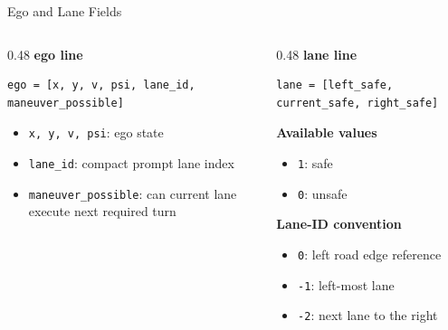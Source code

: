 \documentclass[aspectratio=169]{beamer}
\begin{document}
\begin{frame}[fragile]{Ego and Lane Fields}
\begin{columns}[T]
    \begin{column}{0.48\textwidth}
        \textbf{ego line}
        \begin{lstlisting}[style=codestyle]
ego = [x, y, v, psi, lane_id, maneuver_possible]
        \end{lstlisting}

        \begin{itemize}
            \item \texttt{x, y, v, psi}: ego state
            \item \texttt{lane\_id}: compact prompt lane index
            \item \texttt{maneuver\_possible}: can current lane execute next required turn
        \end{itemize}
    \end{column}
    \begin{column}{0.48\textwidth}
        \textbf{lane line}
        \begin{lstlisting}[style=codestyle]
lane = [left_safe, current_safe, right_safe]
        \end{lstlisting}

        \textbf{Available values}
        \begin{itemize}
            \item \texttt{1}: safe
            \item \texttt{0}: unsafe
        \end{itemize}

        \textbf{Lane-ID convention}
        \begin{itemize}
            \item \texttt{0}: left road edge reference
            \item \texttt{-1}: left-most lane
            \item \texttt{-2}: next lane to the right
        \end{itemize}
    \end{column}
\end{columns}
\end{frame}
\end{document}
